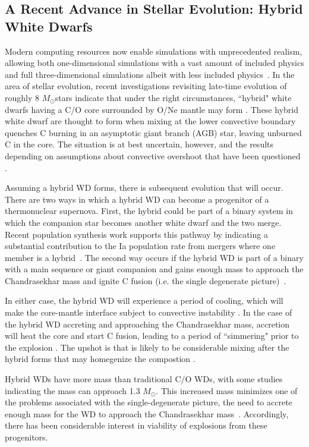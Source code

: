 \documentclass[iop,apj]{emulateapj}
\newcommand{\Msun}{\ensuremath{M_\odot}}
\begin{document}
\subsection{A Recent Advance in Stellar Evolution: Hybrid White Dwarfs}

Modern computing resources now enable simulations with unprecedented 
realism, allowing both one-dimensional simulations with a vast
amount of included physics and full three-dimensional simulations
albeit with less included physics~\cite{caldertownsley2018}.
In the area of stellar evolution, recent investigations revisiting 
late-time evolution of roughly 8 \Msun stars indicate that under
the right circumstances, ``hybrid" white dwarfs having a C/O core surrounded by O/Ne 
mantle may form \citep{siess2009,denissenkovetal2013}. These hybrid
white dwarf are thought to form when mixing at the lower convective boundary quenches
C burning in an asymptotic giant branch (AGB) star, leaving unburned C
in the core. The situation is at best uncertain, however, and the 
results depending on assumptions about convective
overshoot that have been questioned \citep{chenetal2014,lecoanetetal16,lattanzioetal2017}.

Assuming a hybrid WD forms, there is subsequent evolution that will occur. There
are two ways in which a hybrid WD can become a progenitor of a thermonuclear supernova.
First, the hybrid could be part of a binary system in which the companion star becomes
another white dwarf and the two merge. Recent population synthesis work supports
this pathway by indicating a substantial contribution to the Ia population rate from 
mergers where one member is a hybrid~\citep{yungelsonkuranov2017}. The second way
occurs if the hybrid WD is part of a binary with a main sequence or giant companion
and gains enough mass to approach the Chandrasekhar mass and ignite C fusion (i.e.
the single degenerate picture)~\citep{}. 

In either case, the hybrid WD will experience a period of cooling, which will
make the core-mantle interface subject to convective 
instability \citep{brooksetal2017,schwabgaraud2018}. In the case of the 
hybrid WD accreting and approaching the Chandrasekhar mass, accretion will
heat the core and start C fusion, leading to a period of ``simmering" prior
to the explosion \citep{who?}. The upshot is that is likely to be considerable
mixing after the hybrid forms that may homegenize the compostion 
\citep{denissenkovetal2015,brooksetal2017,schwabgaraud2018}.


Hybrid WDs have more mass than traditional C/O WDs, with some studies indicating the
mass can approach 1.3 \Msun \citep{chenetal2014}. This increased mass
minimizes one of the problems associated with the single-degenerate picture,
the need to accrete enough mass for the WD to approach the Chandrasekhar
mass~\citep{chenetal2014,denissenkovetal2015,kromeretal2015}.
Accordingly, there has been considerable interest in viability of explosions from 
these progenitors. 
\end{document}
